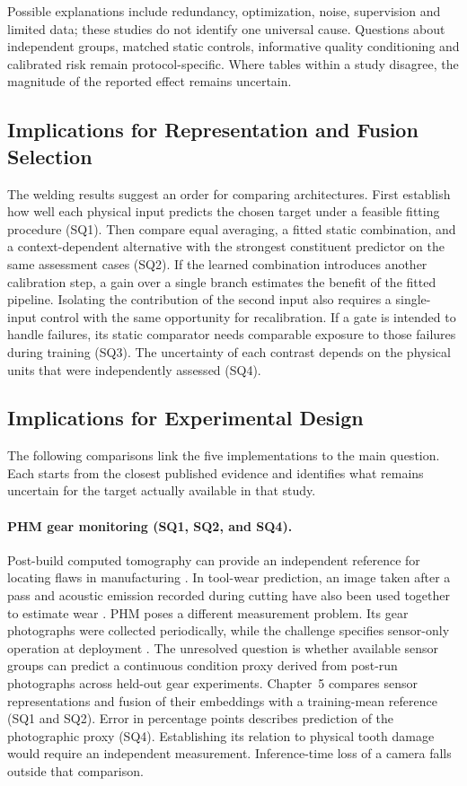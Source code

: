 Possible explanations include redundancy, optimization, noise, supervision and limited data; these studies do not identify one universal cause. Questions about independent groups, matched static controls, informative quality conditioning and calibrated risk remain protocol-specific. Where tables within a study disagree, the magnitude of the reported effect remains uncertain.

\subsection{Implications for Representation and Fusion Selection}
The welding results suggest an order for comparing architectures. First establish how well each physical input predicts the chosen target under a feasible fitting procedure (SQ1). Then compare equal averaging, a fitted static combination, and a context-dependent alternative with the strongest constituent predictor on the same assessment cases (SQ2). If the learned combination introduces another calibration step, a gain over a single branch estimates the benefit of the fitted pipeline. Isolating the contribution of the second input also requires a single-input control with the same opportunity for recalibration. If a gate is intended to handle failures, its static comparator needs comparable exposure to those failures during training (SQ3). The uncertainty of each contrast depends on the physical units that were independently assessed (SQ4).

\subsection{Implications for Experimental Design}
\label{sec:literature-study-gaps}
The following comparisons link the five implementations to the main question. Each starts from the closest published evidence and identifies what remains uncertain for the target actually available in that study.

\paragraph{PHM gear monitoring (SQ1, SQ2, and SQ4).}
Post-build computed tomography can provide an independent reference for locating flaws in manufacturing \citep{Petrich2021Multimodal}. In tool-wear prediction, an image taken after a pass and acoustic emission recorded during cutting have also been used together to estimate wear \citep[PDF pp.~19--24]{P045}. PHM poses a different measurement problem. Its gear photographs were collected periodically, while the challenge specifies sensor-only operation at deployment \citep{PHM2026Challenge}. The unresolved question is whether available sensor groups can predict a continuous condition proxy derived from post-run photographs across held-out gear experiments. Chapter~5 compares sensor representations and fusion of their embeddings with a training-mean reference (SQ1 and SQ2). Error in percentage points describes prediction of the photographic proxy (SQ4). Establishing its relation to physical tooth damage would require an independent measurement. Inference-time loss of a camera falls outside that comparison.


